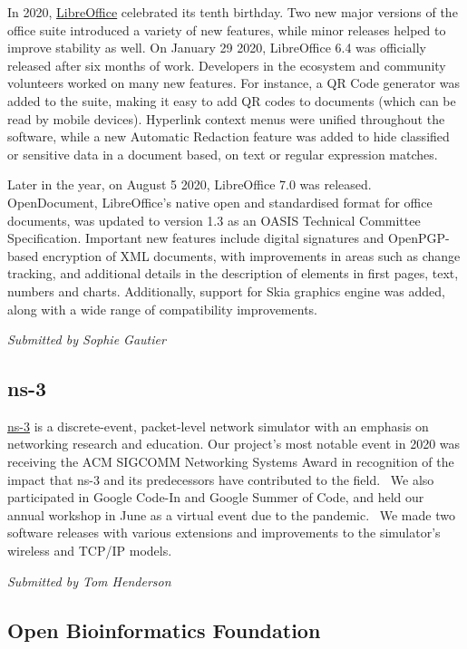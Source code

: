 \documentclass[a4paper]{report}
\begin{document}
In 2020, \href{https://www.libreoffice.org/}{LibreOffice} celebrated its tenth birthday. Two new major versions of the office suite introduced a variety of new features, while minor releases helped to improve stability as well. On January 29 2020, LibreOffice 6.4 was officially released after six months of work. Developers in the ecosystem and community volunteers worked on many new features. For instance, a QR Code generator was added to the suite, making it easy to add QR codes to documents (which can be read by mobile devices).  Hyperlink context menus were unified throughout the software, while a new Automatic Redaction feature was added to hide classified or sensitive data in a document based, on text or regular expression matches.

Later in the year, on August 5 2020, LibreOffice 7.0 was released.  OpenDocument, LibreOffice's native open and standardised format for office documents, was updated to version 1.3 as an OASIS Technical Committee Specification. Important new features include digital signatures and OpenPGP-based encryption of XML documents, with improvements in areas such as change tracking, and additional details in the description of elements in first pages, text, numbers and charts.  Additionally, support for Skia graphics engine was added, along with a wide range of compatibility improvements.

{\em Submitted by Sophie Gautier}

\subsection{ns-3}

\href{https://www.nsnam.org/}{ns-3} is a discrete-event, packet-level network simulator with an emphasis on networking research and education.  Our project's most notable event in 2020 was receiving the ACM SIGCOMM Networking Systems Award in recognition of the impact that ns-3 and its predecessors have contributed to the field.  We also participated in Google Code-In and Google Summer of Code, and held our annual workshop in June as a virtual event due to the pandemic.  We made two software releases with various extensions and improvements to the simulator's wireless and TCP/IP models.

{\em Submitted by Tom Henderson}

\subsection{Open Bioinformatics Foundation}
\end{document}
